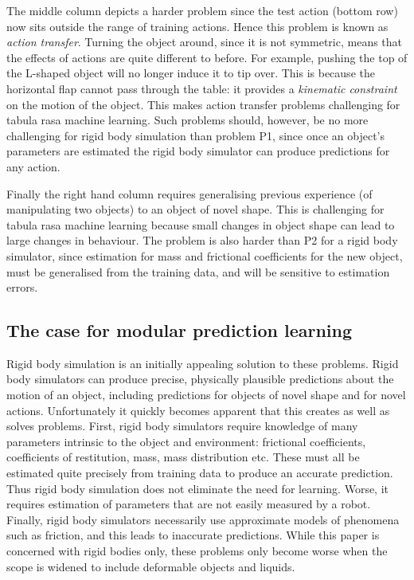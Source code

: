  The middle column depicts a harder problem since the test action (bottom row) now sits outside the range of training actions. Hence this problem is known as {\em action transfer}. Turning the object around, since it is not symmetric, means that the effects of actions are quite different to before. For example, pushing the top of the L-shaped object will no longer induce it to tip over. This is because the horizontal flap cannot pass through the table: it provides a {\em kinematic constraint} on the motion of the object. This makes action transfer problems challenging for tabula rasa machine learning. Such problems should, however, be no more challenging for rigid body simulation than problem P1, since once an object's parameters are estimated the rigid body simulator can produce predictions for any action.

 Finally the right hand column requires generalising previous experience (of manipulating two objects) to an object of novel shape. This is challenging for tabula rasa machine learning because small changes in object shape can lead to large changes in behaviour. The problem is also harder than P2 for a rigid body simulator, since estimation for mass and frictional coefficients for the new object, must be generalised from the training data, and will be sensitive to estimation errors.

\subsection{The case for modular prediction learning}

Rigid body simulation is an initially appealing solution to these problems. Rigid body simulators can produce precise, physically plausible predictions about the motion of an object, including predictions for objects of novel shape and for novel actions. Unfortunately it quickly becomes apparent that this creates as well as solves problems. First, rigid body simulators require knowledge of many parameters intrinsic to the object and environment: frictional coefficients, coefficients of restitution, mass, mass distribution etc. These must all be estimated quite precisely from training data to produce an accurate prediction. Thus rigid body simulation does not eliminate the need for learning. Worse, it requires estimation of parameters that are not easily measured by a robot. Finally, rigid body simulators necessarily use approximate models of phenomena such as friction, and this leads to inaccurate predictions. While this paper is concerned with rigid bodies only, these problems only become worse when the scope is widened to include deformable objects and liquids.

